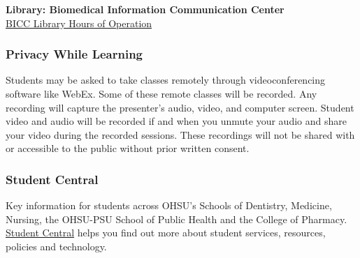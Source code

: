 \documentclass[
  letterpaper,
  DIV=11,
  numbers=noendperiod]{scrartcl}
\begin{document}
\textbf{Library: Biomedical Information Communication Center}\\
\href{http://www.ohsu.edu/xd/education/library/about/hours.cfm}{BICC
Library Hours of Operation}

\hypertarget{privacy-while-learning}{%
\subsubsection{Privacy While Learning}\label{privacy-while-learning}}

Students may be asked to take classes remotely through videoconferencing
software like WebEx. Some of these remote classes will be recorded. Any
recording will capture the presenter's audio, video, and computer
screen. Student video and audio will be recorded if and when you unmute
your audio and share your video during the recorded sessions. These
recordings will not be shared with or accessible to the public without
prior written consent.~

\hypertarget{student-central}{%
\subsubsection{Student Central}\label{student-central}}

Key information for students across OHSU's Schools of Dentistry,
Medicine, Nursing, the OHSU-PSU School of Public Health and the College
of Pharmacy.
\href{https://o2.ohsu.edu/student-central/index.cfm}{Student Central}
helps you find out more about student services, resources, policies and
technology.
\end{document}
